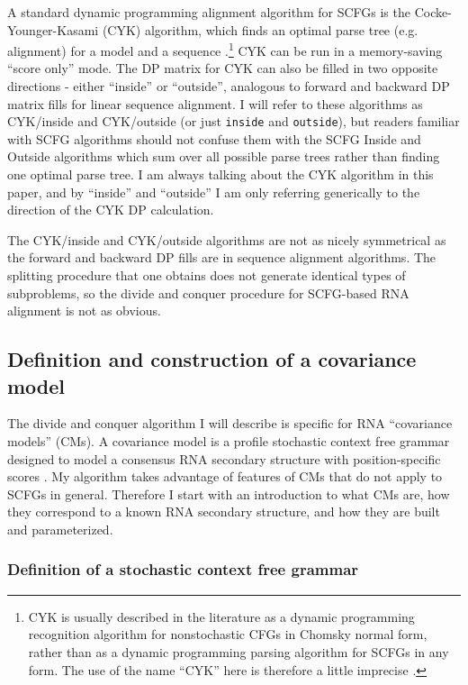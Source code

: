 \documentclass[11pt]{article}
\begin{document}
A standard dynamic programming alignment algorithm for SCFGs is the
Cocke-Younger-Kasami (CYK) algorithm, which finds an optimal parse
tree (e.g. alignment) for a model and a sequence
\cite{Kasami65,Younger67,HopcroftUllman79,Durbin98}.\footnote{CYK is
usually described in the literature as a dynamic programming
recognition algorithm for nonstochastic CFGs in Chomsky normal form,
rather than as a dynamic programming parsing algorithm for SCFGs in
any form. The use of the name ``CYK'' here is therefore a little imprecise
\cite{Durbin98}.}  CYK can be run in a memory-saving ``score only''
mode. The DP matrix for CYK can also be filled in two opposite
directions - either ``inside'' or ``outside'', analogous to forward
and backward DP matrix fills for linear sequence alignment.  I will
refer to these algorithms as CYK/inside and CYK/outside (or just
\texttt{inside} and \texttt{outside}), but readers familiar with SCFG
algorithms should not confuse them with the SCFG Inside and Outside
algorithms \cite{Lari90,Lari91} which sum over all possible parse
trees rather than finding one optimal parse tree. I am always talking
about the CYK algorithm in this paper, and by ``inside'' and
``outside'' I am only referring generically to the direction of the
CYK DP calculation.

The CYK/inside and CYK/outside algorithms are not as nicely
symmetrical as the forward and backward DP fills are in sequence
alignment algorithms. The splitting procedure that one obtains does
not generate identical types of subproblems, so the divide and conquer
procedure for SCFG-based RNA alignment is not as obvious.

\subsection{Definition and construction of a covariance model}

The divide and conquer algorithm I will describe is specific for RNA
``covariance models'' (CMs). A covariance model is a profile
stochastic context free grammar designed to model a consensus RNA
secondary structure with position-specific scores
\cite{Eddy94,Durbin98}. My algorithm takes advantage of features of
CMs that do not apply to SCFGs in general.  Therefore I start with an
introduction to what CMs are, how they correspond to a known RNA
secondary structure, and how they are built and parameterized.

\subsubsection{Definition of a stochastic context free grammar}
\end{document}
